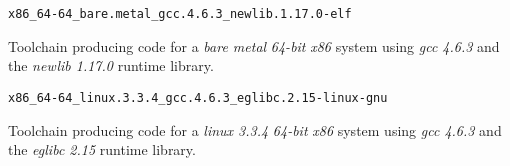 \begin{description}
\item{\texttt{x86\_64-64\_bare.metal\_gcc.4.6.3\_newlib.1.17.0-elf}}

  Toolchain producing code for a \emph{bare metal} \emph{64-bit}
  \emph{x86} system using \emph{gcc 4.6.3} and the \emph{newlib
    1.17.0} runtime library.


\item{\texttt{x86\_64-64\_linux.3.3.4\_gcc.4.6.3\_eglibc.2.15-linux-gnu}}

  Toolchain producing code for a \emph{linux 3.3.4} \emph{64-bit}
  \emph{x86} system using \emph{gcc 4.6.3} and the \emph{eglibc 2.15}
  runtime library.
\end{description}
